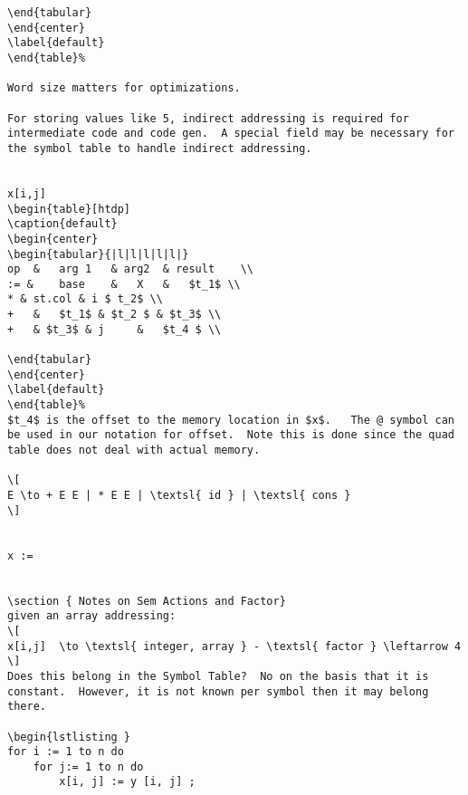 \begin{lstlisting}
\end{tabular}
\end{center}
\label{default}
\end{table}%

Word size matters for optimizations.       

For storing values like 5, indirect addressing is required for intermediate code and code gen.  A special field may be necessary for the symbol table to handle indirect addressing.    


x[i,j] 
\begin{table}[htdp]
\caption{default}
\begin{center}
\begin{tabular}{|l|l|l|l|l|}
op	&	arg 1	& arg2	& result	\\
:= &	base	&	X	&	$t_1$ \\
* &	st.col & i $ t_2$ \\
+	& 	$t_1$ & $t_2 $ & $t_3$ \\
+  	& $t_3$ & j 	&	$t_4 $ \\

\end{tabular}
\end{center}
\label{default}
\end{table}%
$t_4$ is the offset to the memory location in $x$.   The @ symbol can be used in our notation for offset.  Note this is done since the quad table does not deal with actual memory.  

\[
E \to + E E | * E E | \textsl{ id } | \textsl{ cons }
\]


x := 


\section { Notes on Sem Actions and Factor}
given an array addressing:
\[
x[i,j]  \to \textsl{ integer, array } - \textsl{ factor } \leftarrow 4 
\]
Does this belong in the Symbol Table?  No on the basis that it is constant.  However, it is not known per symbol then it may belong there.  

\begin{lstlisting }
for i := 1 to n do
	for j:= 1 to n do 
		x[i, j] := y [i, j] ;
\end{lstlisting}

